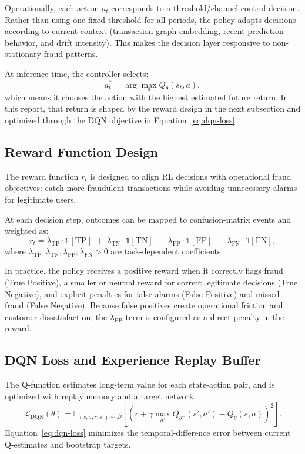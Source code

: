 \documentclass[12pt,a4paper]{report}
\begin{document}
Operationally, each action $a_t$ corresponds to a threshold/channel-control decision. Rather than using one fixed threshold for all periods, the policy adapts decisions according to current context (transaction graph embedding, recent prediction behavior, and drift intensity). This makes the decision layer responsive to non-stationary fraud patterns.

At inference time, the controller selects:
\[
a_t^*=\arg\max_{a} Q_{\theta}(s_t,a),
\]
which means it chooses the action with the highest estimated future return. In this report, that return is shaped by the reward design in the next subsection and optimized through the DQN objective in Equation~\eqref{eq:dqn-loss}.

\subsection{Reward Function Design}
The reward function $r_t$ is designed to align RL decisions with operational fraud objectives: catch more fraudulent transactions while avoiding unnecessary alarms for legitimate users.

At each decision step, outcomes can be mapped to confusion-matrix events and weighted as:
\begin{equation}
r_t =
\lambda_{\mathrm{TP}}\cdot \mathbb{1}[\mathrm{TP}]
\;+\;
\lambda_{\mathrm{TN}}\cdot \mathbb{1}[\mathrm{TN}]
\;-\;
\lambda_{\mathrm{FP}}\cdot \mathbb{1}[\mathrm{FP}]
\;-\;
\lambda_{\mathrm{FN}}\cdot \mathbb{1}[\mathrm{FN}],
\end{equation}
where $\lambda_{\mathrm{TP}},\lambda_{\mathrm{TN}},\lambda_{\mathrm{FP}},\lambda_{\mathrm{FN}}>0$ are task-dependent coefficients.

In practice, the policy receives a positive reward when it correctly flags fraud (True Positive), a smaller or neutral reward for correct legitimate decisions (True Negative), and explicit penalties for false alarms (False Positive) and missed fraud (False Negative). Because false positives create operational friction and customer dissatisfaction, the $\lambda_{\mathrm{FP}}$ term is configured as a direct penalty in the reward.

\subsection{DQN Loss and Experience Replay Buffer}
The Q-function estimates long-term value for each state-action pair, and is optimized with replay memory and a target network:
\begin{equation}
\mathcal{L}_{\mathrm{DQN}}(\theta)=
\mathbb{E}_{(s,a,r,s')\sim\mathcal{D}}
\left[
\left(r+\gamma \max_{a'}Q_{\theta^-}(s',a')-Q_{\theta}(s,a)\right)^2
\right].
\label{eq:dqn-loss}
\end{equation}
Equation~\eqref{eq:dqn-loss} minimizes the temporal-difference error between current Q-estimates and bootstrap targets.
\end{document}

